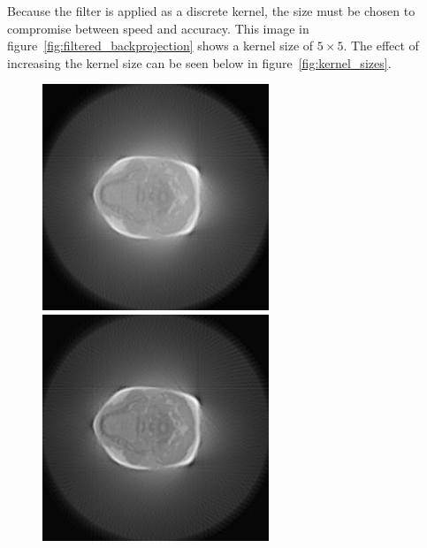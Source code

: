         Because the filter is applied as a discrete kernel, the size must be chosen to compromise between speed and accuracy. This image in figure~\ref{fig:filtered_backprojection} shows a kernel size of $5\times 5$. The effect of increasing the kernel size can be seen below in figure~\ref{fig:kernel_sizes}.
        \begin{figure}[ht]
            \centering
            \begin{minipage}[c]{0.3\linewidth}
                \centering
                \includegraphics[width=\textwidth]{Files/report_images/SUM_backprojections_k7.jpg}
            \end{minipage}
            \begin{minipage}[c]{0.3\linewidth}
                \centering
                \includegraphics[width=\textwidth]{Files/report_images/SUM_backprojections_k9.jpg}

\end{minipage}
\end{figure}
